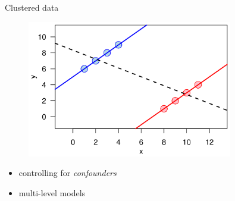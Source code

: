 \documentclass[
  ignorenonframetext,
]{beamer}
\providecommand{\tightlist}{%
  \setlength{\itemsep}{0pt}\setlength{\parskip}{0pt}}
\newcommand{\setsep}{\setlength{\itemsep}{3pt}}
\newcommand{\setskip}{\setlength{\parskip}{3pt}}
\renewcommand{\tightlist}{\setsep\setskip}
\begin{document}
\begin{frame}{Clustered data}
\label{clustered-data}
\pause

\begin{figure}
\centering
\includegraphics[width = 0.8\textwidth]{simpsons-paradox}
\end{figure}

\pause

\begin{itemize}[<+->]
\tightlist
\item
  controlling for \emph{confounders}
\item
  multi-level models
\end{itemize}
\end{frame}
\end{document}
